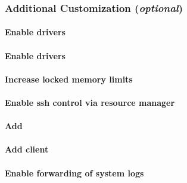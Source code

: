 \documentclass[letterpaper]{article}
\begin{document}
\subsubsection{Additional Customization ({\em optional})} \label{sec:addl_customizations}


\paragraph{Enable \InfiniBand{} drivers}


\paragraph{Enable \OmniPath{} drivers}


\vspace*{0.28cm}
\paragraph{Increase locked memory limits}


\vspace*{-.17cm}
\paragraph{Enable ssh control via resource manager} 


\vspace*{-.17cm}
\paragraph{Add \beegfs{}} \label{sec:add_beegfs}


\paragraph{Add \Lustre{} client} \label{sec:lustre_client}




\paragraph{Enable forwarding of system logs} \label{sec:add_syslog}

\end{document}
